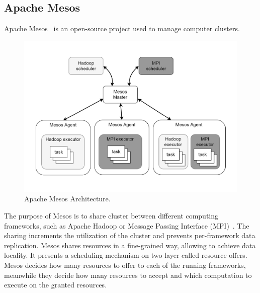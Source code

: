 \subsection{Apache Mesos}\label{sec:apache_mesos}
Apache Mesos~\cite{Mesos} is an open-source project used to manage computer
clusters. 
\begin{figure}
	\vspace{-1cm}
	\centering
	\includegraphics[width=\columnwidth]{Images/apache_mesos_architecture.pdf}  
	\vspace{-1cm}
	\caption[Apache Mesos Architecture]{Apache Mesos Architecture.}
	\label{fig:apacheMesosArchitecture}
\end{figure}
The purpose of Mesos is to share cluster between different computing frameworks, such as Apache Hadoop or Message Passing Interface (MPI)~. The sharing increments the utilization of the cluster
and prevents per-framework data replication. 
Mesos shares resources in a fine-grained way, allowing to achieve data locality. It presents a scheduling mechanism on two layer called resource offers. Mesos decides how many resources to offer to each of the running frameworks, meanwhile they decide how many resources to accept and which computation to execute on the granted resources. 


